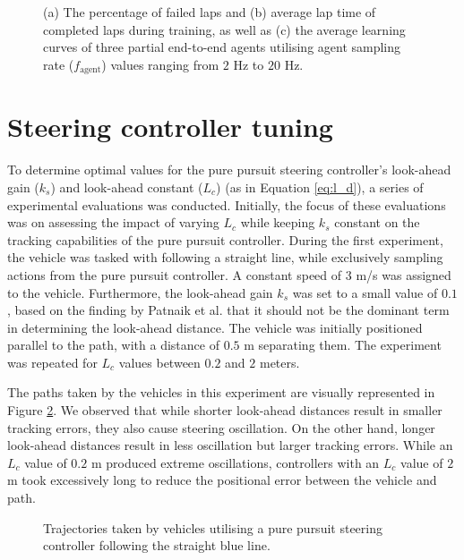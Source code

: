 \begin{figure}[htb!]
    \centering
    
    \caption[Learning curves for partial end-to-end agents trained with different agent sampling rates]{(a) The percentage of failed laps and (b) average lap time of completed laps during training, as well as (c) the average learning curves of three partial end-to-end agents utilising agent sampling rate ($f_{\text{agent}}$) values ranging from $2$ Hz to $20$ Hz.}
    \label{fig:f_agent_pete}
\end{figure}




\section{Steering controller tuning}

To determine optimal values for the pure pursuit steering controller's look-ahead gain ($k_s$) and look-ahead constant ($L_c$) (as in Equation \ref{eq:l_d}), a series of experimental evaluations was conducted. 
Initially, the focus of these evaluations was on assessing the impact of varying $L_c$ while keeping $k_s$ constant on the tracking capabilities of the pure pursuit controller.
During the first experiment, the vehicle was tasked with following a straight line, while exclusively sampling actions from the pure pursuit controller. 
A constant speed of $3$ m/s was assigned to the vehicle.
Furthermore, the look-ahead gain $k_s$ was set to a small value of $0.1$, based on the finding by Patnaik et al. \cite{Patnaik2020} that it should not be the dominant term in determining the look-ahead distance.
The vehicle was initially positioned parallel to the path, with a distance of $0.5$ m separating them. 
The experiment was repeated for $L_c$ values between $0.2$ and $2$ meters.

The paths taken by the vehicles in this experiment are visually represented in Figure \ref{fig:lfc}. 
We observed that while shorter look-ahead distances result in smaller tracking errors, they also cause steering oscillation.
On the other hand, longer look-ahead distances result in less oscillation but larger tracking errors.
While an $L_c$ value of $0.2$ m produced extreme oscillations, controllers with an $L_c$ value of $2$ m took excessively long to reduce the positional error between the vehicle and path. 

\begin{figure}[b]
    \centering
    
    \caption[Tracjectories taken by vehicles following a straight line starting from an offset position]{Trajectories taken by vehicles utilising a pure pursuit steering controller following the straight blue line.}
    \label{fig:lfc}
\end{figure}

